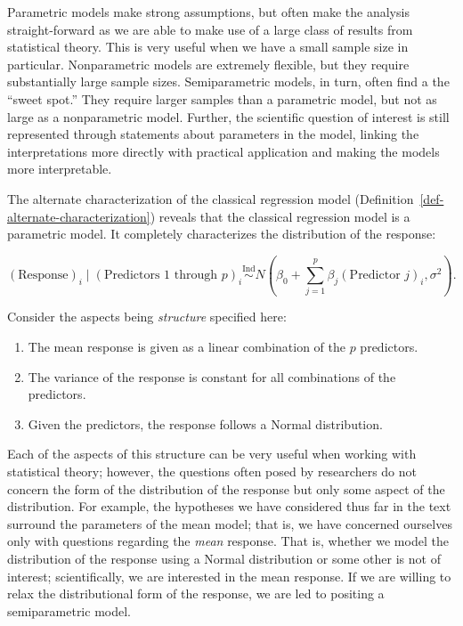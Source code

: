 \documentclass[
  letterpaper,
  DIV=11,
  numbers=noendperiod]{scrreprt}
\providecommand{\tightlist}{%
  \setlength{\itemsep}{0pt}\setlength{\parskip}{0pt}}\usepackage{longtable,booktabs,array}
\theoremstyle{definition}
\theoremstyle{definition}
\theoremstyle{remark}
\begin{document}
Parametric models make strong assumptions, but often make the analysis
straight-forward as we are able to make use of a large class of results
from statistical theory. This is very useful when we have a small sample
size in particular. Nonparametric models are extremely flexible, but
they require substantially large sample sizes. Semiparametric models, in
turn, often find a the ``sweet spot.'' They require larger samples than
a parametric model, but not as large as a nonparametric model. Further,
the scientific question of interest is still represented through
statements about parameters in the model, linking the interpretations
more directly with practical application and making the models more
interpretable.

The alternate characterization of the classical regression model
(Definition~\ref{def-alternate-characterization}) reveals that the
classical regression model is a parametric model. It completely
characterizes the distribution of the response:

\[(\text{Response})_i \mid (\text{Predictors 1 through } p)_i \stackrel{\text{Ind}}{\sim} N\left(\beta_0 + \sum\limits_{j=1}^{p} \beta_j (\text{Predictor } j)_i, \sigma^2\right).\]

Consider the aspects being \emph{structure} specified here:

\begin{enumerate}
\def\labelenumi{\arabic{enumi}.}
\tightlist
\item
  The mean response is given as a linear combination of the \(p\)
  predictors.
\item
  The variance of the response is constant for all combinations of the
  predictors.
\item
  Given the predictors, the response follows a Normal distribution.
\end{enumerate}

Each of the aspects of this structure can be very useful when working
with statistical theory; however, the questions often posed by
researchers do not concern the form of the distribution of the response
but only some aspect of the distribution. For example, the hypotheses we
have considered thus far in the text surround the parameters of the mean
model; that is, we have concerned ourselves only with questions
regarding the \emph{mean} response. That is, whether we model the
distribution of the response using a Normal distribution or some other
is not of interest; scientifically, we are interested in the mean
response. If we are willing to relax the distributional form of the
response, we are led to positing a semiparametric model.
\end{document}
